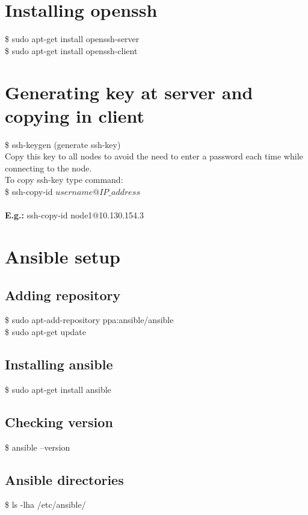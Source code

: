\documentclass[12pt]{report}
\begin{document}
\section{Installing openssh}
\$ sudo apt-get install openssh-server\\
\$ sudo apt-get install openssh-client
\section{Generating key at server and copying in client}
\$ ssh-keygen (generate ssh-key)\\
Copy this key to all nodes to avoid the need to enter a password each time while connecting to the node.\\
To copy ssh-key type command:\\
\$ ssh-copy-id $username@IP\_address$\\\\
\textbf{E.g.:} ssh-copy-id node1@10.130.154.3
\section{Ansible setup}
\subsection{Adding repository}
\$ sudo apt-add-repository ppa:ansible/ansible\\
\$ sudo apt-get update
\subsection{Installing ansible}
\$ sudo apt-get install ansible
\subsection{Checking version}
\$ ansible  --version
\subsection{Ansible directories}
\$ ls -lha /etc/ansible/
\end{document}

